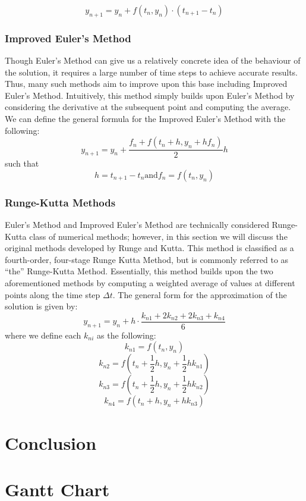 \documentclass{article} %
\begin{document}
\begin{multicols}{2}
\[
    y_{n+1} = y_{n} + f(t_{n}, y_{n}) \cdot (t_{n+1} - t_{n})
\]

\subsubsection{Improved Euler's Method}
\label{subsubsec:improved_euler_method} %

Though Euler's Method can give us a relatively concrete idea of the behaviour of the solution, it requires a large number of time steps to achieve accurate results.
Thus, many such methods aim to improve upon this base including Improved Euler's Method.
Intuitively, this method simply builds upon Euler's Method by considering the derivative at the subsequent point and computing the average.
We can define the general formula for the Improved Euler's Method with the following:
\[
    y_{n+1} = y_{n} + \frac{f_{n} + f(t_{n} + h, y_{n} + hf_{n})}{2}h
\]
such that 
\[
    h = t_{n + 1} - t_{n} \text{and} f_{n} = f(t_{n}, y_{n})
\]

\subsubsection{Runge-Kutta Methods}
\label{subsubsec:runge_kutta}

Euler's Method and Improved Euler's Method are technically considered Runge-Kutta class of numerical methods; however, in this section we will discuss the original methods developed by Runge and Kutta.
This method is classified as a fourth-order, four-stage Runge Kutta Method, but is commonly referred to as ``the'' Runge-Kutta Method.
Essentially, this method builds upon the two aforementioned methods by computing a weighted average of values at different points along the time step $\Delta t$.
The general form for the approximation of the solution is given by:
\[
    y_{n+1} = y_{n} + h \cdot \frac{k_{n1} + 2k_{n2} + 2k_{n3} + k_{n4}}{6}
\]
where we define each $k_{ni}$ as the following:
\[
    k_{n1} = f(t_{n}, y_{n})
\]
\[
    k_{n2} = f\left(t_{n} + \frac{1}{2}h, y_{n} + \frac{1}{2}hk_{n1}\right)
\]
\[
    k_{n3} = f\left(t_{n} + \frac{1}{2}h, y_{n} + \frac{1}{2}hk_{n2}\right)
\]
\[
    k_{n4} = f(t_{n} + h, y_{n} + hk_{n3})
\]

\section{Conclusion}

\label{last_page}

\newpage




\end{multicols}

\newpage
\appendix

\section{Gantt Chart}
\label{app: appendix_a}
\end{document}
